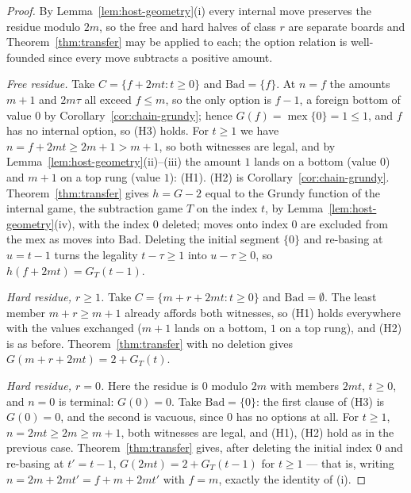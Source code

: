 \begin{proof}
By Lemma~\ref{lem:host-geometry}(i) every internal move preserves the
residue modulo $2m$, so the free and hard halves of class $r$ are
separate boards and Theorem~\ref{thm:transfer} may be applied to each;
the option relation is well-founded since every move subtracts a positive
amount.

\emph{Free residue.} Take $C = \{f + 2mt : t \ge 0\}$ and
$\mathrm{Bad} = \{f\}$. At $n = f$ the amounts $m+1$ and $2m\tau$ all
exceed $f \le m$, so the only option is $f - 1$, a foreign bottom of
value $0$ by Corollary~\ref{cor:chain-grundy}; hence
$G(f) = \operatorname{mex}\{0\} = 1 \le 1$, and $f$ has no internal
option, so (H3) holds. For $t \ge 1$ we have
$n = f + 2mt \ge 2m + 1 > m + 1$, so both witnesses are legal, and by
Lemma~\ref{lem:host-geometry}(ii)--(iii) the amount $1$ lands on a bottom
(value $0$) and $m+1$ on a top rung (value $1$): (H1). (H2) is
Corollary~\ref{cor:chain-grundy}. Theorem~\ref{thm:transfer} gives
$h = G - 2$ equal to the Grundy function of the internal game, the
subtraction game $T$ on the index $t$, by
Lemma~\ref{lem:host-geometry}(iv), with the index $0$ deleted; moves
onto index $0$ are excluded from the mex as moves into $\mathrm{Bad}$.
Deleting the initial segment $\{0\}$ and re-basing at $u = t - 1$ turns
the legality $t - \tau \ge 1$ into $u - \tau \ge 0$, so
$h(f + 2mt) = G_T(t - 1)$.

\emph{Hard residue, $r \ge 1$.} Take $C = \{m + r + 2mt : t \ge 0\}$ and
$\mathrm{Bad} = \emptyset$. The least member $m + r \ge m + 1$ already
affords both witnesses, so (H1) holds everywhere with the values
exchanged ($m+1$ lands on a bottom, $1$ on a top rung), and (H2) is
as before. Theorem~\ref{thm:transfer} with no deletion gives
$G(m + r + 2mt) = 2 + G_T(t)$.

\emph{Hard residue, $r = 0$.} Here the residue is $0$ modulo $2m$ with
members $2mt$, $t \ge 0$, and $n = 0$ is terminal: $G(0) = 0$. Take
$\mathrm{Bad} = \{0\}$: the first clause of (H3) is $G(0) = 0$, and the
second is vacuous, since $0$ has no options at all. For $t \ge 1$,
$n = 2mt \ge 2m \ge m + 1$, both witnesses are legal, and (H1), (H2) hold
as in the previous case. Theorem~\ref{thm:transfer} gives, after deleting
the initial index $0$ and re-basing at $t' = t - 1$,
$G(2mt) = 2 + G_T(t - 1)$ for $t \ge 1$ --- that is, writing
$n = 2m + 2mt' = f + m + 2mt'$ with $f = m$, exactly the identity of (i).
\end{proof}


